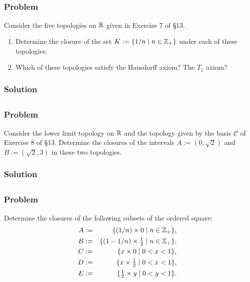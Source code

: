 
\subsection{}

\subsubsection{Problem}
Consider the five topologies on $\mathbb R$ given in Exercise 7 of \S 13.
\begin{enumerate}
    \item Determine the closure of the set $K := \{ 1/n \mid n \in \mathbb Z_+ \}$ under each of these topologies.
    \item Which of these topologies satisfy the Hausdorff axiom? The $T_1$ axiom?
\end{enumerate}
\subsubsection{Solution}
\todo


\subsection{}

\subsubsection{Problem}
Consider the lower limit topology on $\mathbb R$ and the topology given by the basis $\mathcal{C}$ of Exercise 8 of \S 13. Determine the closures of the intervals $A := (0, \sqrt{2})$ and $B := (\sqrt{2}, 3)$ in these two topologies.
\subsubsection{Solution}
\todo


\subsection{}

\subsubsection{Problem}
Determine the closures of the following subsets of the ordered square:
\begin{eqnarray*}
    A & := & \{ (1/n) \times 0 \mid n \in \mathbb Z_+ \},\\
    B & := & \{ (1-1/n) \times \tfrac12 \mid n \in \mathbb Z_+ \},\\
    C & := & \{ x \times 0 \mid 0 < x < 1 \},\\
    D & := & \{ x \times \tfrac12 \mid 0 < x < 1 \},\\
    E & := & \{ \tfrac12 \times y \mid 0 < y < 1 \}.
\end{eqnarray*}
